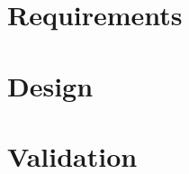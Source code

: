 \documentclass[12pt,a4paper,openright,twoside]{book}
\begin{document}
\chapter{Requirements} 
\label{chap:requirements}


\chapter{Design} 
\label{chap:design}


\chapter{Validation} %
\label{chap:validation}


\chapter{\conclusionsname}
\label{chap:conclusions}





\end{document}
